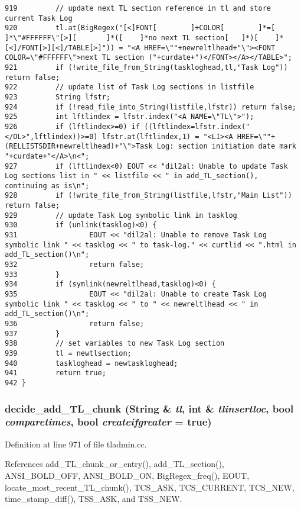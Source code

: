 \begin{verbatim}
919         // update next TL section reference in tl and store current Task Log
920         tl.at(BigRegex("[<]FONT[        ]+COLOR[        ]*=[    ]*\"#FFFFFF\"[>][       ]*([    ]*no next TL section[   ]*)[    ]*[<]/FONT[>][<]/TABLE[>]")) = "<A HREF=\""+newreltlhead+"\"><FONT COLOR=\"#FFFFFF\">next TL section ("+curdate+")</FONT></A></TABLE>";
921         if (!write_file_from_String(taskloghead,tl,"Task Log")) return false;
922         // update list of Task Log sections in listfile
923         String lfstr;
924         if (!read_file_into_String(listfile,lfstr)) return false;
925         int lftlindex = lfstr.index("<A NAME=\"TL\">");
926         if (lftlindex>=0) if ((lftlindex=lfstr.index("</OL>",lftlindex))>=0) lfstr.at(lftlindex,1) = "<LI><A HREF=\""+(RELLISTSDIR+newreltlhead)+"\">Task Log: section initiation date mark "+curdate+"</A>\n<";
927         if (lftlindex<0) EOUT << "dil2al: Unable to update Task Log sections list in " << listfile << " in add_TL_section(), continuing as is\n";
928         if (!write_file_from_String(listfile,lfstr,"Main List")) return false;
929         // update Task Log symbolic link in tasklog
930         if (unlink(tasklog)<0) {
931                 EOUT << "dil2al: Unable to remove Task Log symbolic link " << tasklog << " to task-log." << curtlid << ".html in add_TL_section()\n";
932                 return false;
933         }
934         if (symlink(newreltlhead,tasklog)<0) {
935                 EOUT << "dil2al: Unable to create Task Log symbolic link " << tasklog << " to " << newreltlhead << " in add_TL_section()\n";
936                 return false;
937         }
938         // set variables to new Task Log section
939         tl = newtlsection;
940         taskloghead = newtaskloghead;
941         return true;
942 }
\end{verbatim}\normalsize 
{}
\subsubsection{ decide\_\-add\_\-TL\_\-chunk ({\bf String} \& {\em tl}, int \& {\em tlinsertloc}, bool {\em comparetimes}, bool {\em createifgreater} = {\bf true})}\label{tladmin_8cc_a12}




Definition at line 971 of file tladmin.cc.

References add\_\-TL\_\-chunk\_\-or\_\-entry(), add\_\-TL\_\-section(), ANSI\_\-BOLD\_\-OFF, ANSI\_\-BOLD\_\-ON, Big\-Regex\_\-freq(), EOUT, locate\_\-most\_\-recent\_\-TL\_\-chunk(), TCS\_\-ASK, TCS\_\-CURRENT, TCS\_\-NEW, time\_\-stamp\_\-diff(), TSS\_\-ASK, and TSS\_\-NEW.

